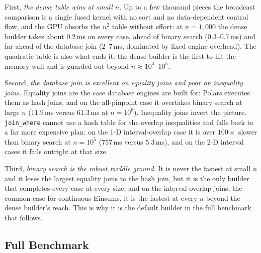 First, \emph{the dense table wins at small $n$}. Up to a few thousand
pieces the broadcast comparison is a single fused kernel with no sort
and no data-dependent control flow, and the GPU absorbs the $n^2$
table without effort: at $n = 1{,}000$ the dense builder takes about
$0.2$\,ms on every case, ahead of binary search ($0.3$--$0.7$\,ms) and
far ahead of the database join ($2$--$7$\,ms, dominated by fixed
engine overhead). The quadratic table is also what ends it: the dense
builder is the first to hit the memory wall and is guarded out beyond
$n \approx 10^{4}$--$10^{5}$.

Second, \emph{the database join is excellent on equality joins and
poor on inequality joins}. Equality joins are the case database
engines are built for: Polars executes them as hash joins, and on the
all-pinpoint case it overtakes binary search at large $n$
($11.9$\,ms versus $61.3$\,ms at $n = 10^{6}$). Inequality joins
invert the picture. \texttt{join\_where} cannot use a hash table for
the overlap inequalities and falls back to a far more expensive plan:
on the 1-D interval-overlap case it is over $100\times$ slower than
binary search at $n = 10^{5}$ ($757$\,ms versus $5.3$\,ms), and on the
2-D interval cases it fails outright at that size.

Third, \emph{binary search is the robust middle ground}. It is never
the fastest at small $n$ and it loses the largest equality joins to
the hash join, but it is the only builder that completes every case at
every size, and on the interval-overlap joins, the common case for
continuous Einsums, it is the fastest at every $n$ beyond the dense
builder's reach. This is why it is the default builder in the full
benchmark that follows.

\subsection{Full Benchmark}
\label{subsec:eval-full}

